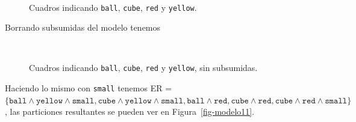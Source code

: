 \begin{figure}[ht]
\begin{center}
\\[0pt]
\caption{Cuadros indicando \texttt{ball}, \texttt{cube}, \texttt{red} y \texttt{yellow}.}
\label{fig-modelo10}
\end{center}
\end{figure}

Borrando subsumidas del modelo tenemos
\begin{figure}[ht]
\begin{center}
\\[0pt]
\caption{Cuadros indicando \texttt{ball}, \texttt{cube}, \texttt{red} y \texttt{yellow}, sin subsumidas.}
\label{fig-modelo10}
\end{center}
\end{figure}

Haciendo lo mismo con \texttt{small} tenemos ER = $\{\texttt{ball} \wedge \texttt{yellow} \wedge \texttt{small}, \texttt{cube} \wedge \texttt{yellow} \wedge \texttt{small}, \texttt{ball} \wedge \texttt{red}, \texttt{cube} \wedge \texttt{red}, \texttt{cube} \wedge \texttt{red} \wedge \texttt{small}\}$, las particiones resultantes se pueden ver en Figura~\ref{fig-modelo11}.

%

